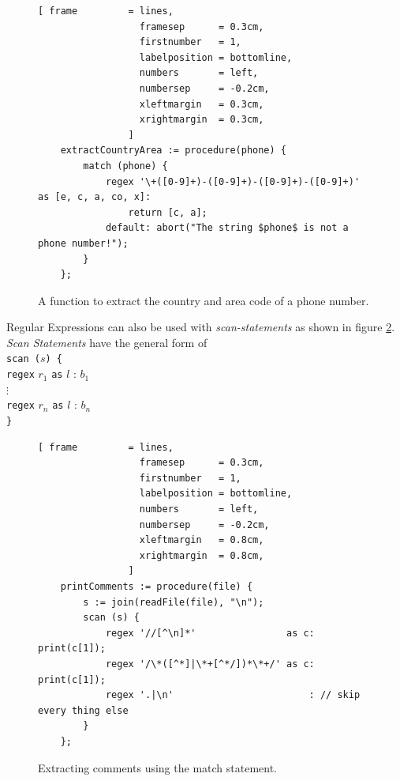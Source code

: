\documentclass[11pt]{report}
\begin{document}
\begin{figure}[!ht]
\centering
\begin{Verbatim}[ frame         = lines, 
                  framesep      = 0.3cm, 
                  firstnumber   = 1,
                  labelposition = bottomline,
                  numbers       = left,
                  numbersep     = -0.2cm,
                  xleftmargin   = 0.3cm,
                  xrightmargin  = 0.3cm,
                ]
    extractCountryArea := procedure(phone) {
        match (phone) {
            regex '\+([0-9]+)-([0-9]+)-([0-9]+)-([0-9]+)' as [e, c, a, co, x]:
                return [c, a];
            default: abort("The string $phone$ is not a phone number!");
        }
    };
\end{Verbatim}
\vspace*{-0.3cm}
\caption{A function to extract the country and area code of a phone number.}
\label{fig:extract-phone-code.stlx}
\end{figure}
\pagebreak
Regular Expressions can also be used with \textsl{scan-statements} as shown in figure \ref{fig:find-comments-scan.stlx}. \textsl{Scan Statements} have the general form of
\\[0.2cm]
\hspace*{1.3cm} \texttt{scan ($s$) \{}  \\
\hspace*{1.8cm} \texttt{regex} $r_1$ \texttt{as} $l$ : $b_1$ \\
\hspace*{1.8cm} $\vdots$                                                  \\
\hspace*{1.8cm} \texttt{regex} $r_n$ \texttt{as} $l$ : $b_n$ \\
\hspace*{1.3cm} \texttt{\}}             
\\[0.2cm]

\begin{figure}[!ht]
\centering
\begin{Verbatim}[ frame         = lines, 
                  framesep      = 0.3cm, 
                  firstnumber   = 1,
                  labelposition = bottomline,
                  numbers       = left,
                  numbersep     = -0.2cm,
                  xleftmargin   = 0.8cm,
                  xrightmargin  = 0.8cm,
                ]
    printComments := procedure(file) {
        s := join(readFile(file), "\n");
        scan (s) {
            regex '//[^\n]*'                as c: print(c[1]);
            regex '/\*([^*]|\*+[^*/])*\*+/' as c: print(c[1]);
            regex '.|\n'                        : // skip every thing else
        }
    };
\end{Verbatim}
\vspace*{-0.3cm}
\caption{Extracting comments using the match statement.}
\label{fig:find-comments-scan.stlx}
\end{figure}
\end{document}
